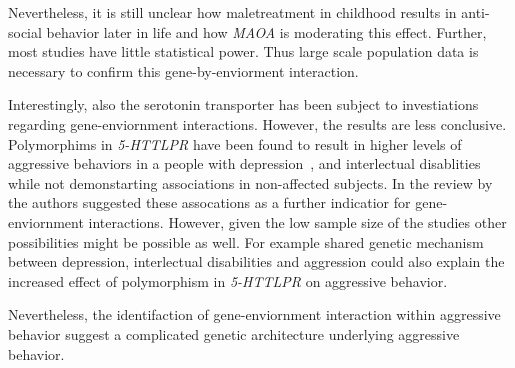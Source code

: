 Nevertheless, it is still unclear how maletreatment in childhood results in anti-social behavior later in life and how \textit{MAOA} is moderating this effect.
Further, most studies have little statistical power.
Thus large scale population data is necessary to confirm this gene-by-enviorment interaction.

Interestingly, also the serotonin transporter has been subject to investiations regarding gene-enviornment interactions.
However, the results are less conclusive.
Polymorphims in \textit{5-HTTLPR} have been found to result in higher levels of aggressive behaviors in a people with depression~\cite{Gonda2011}, and interlectual disablities~\cite{May2010} while not demonstarting associations in non-affected subjects.
In the review by~\citet{Anholt2012} the authors suggested these assocations as a further indicatior for gene-enviornment interactions.
However, given the low sample size of the studies other possibilities might be possible as well.
For example shared genetic mechanism between depression, interlectual disabilities and aggression could also explain the increased effect of polymorphism in \textit{5-HTTLPR} on aggressive behavior. 

Nevertheless, the identifaction of gene-enviornment interaction within aggressive behavior suggest a complicated genetic architecture underlying aggressive behavior.
